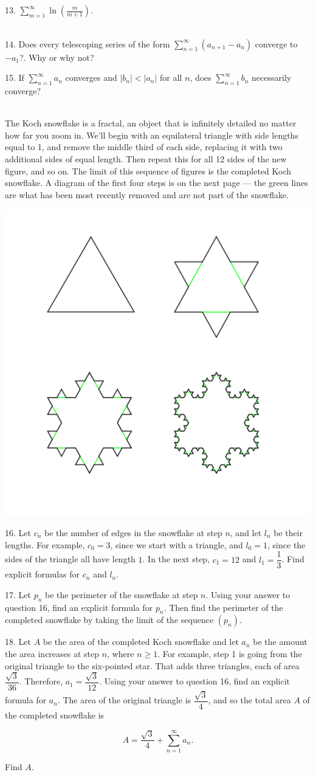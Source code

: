 \documentclass{article}
\begin{document}
13. $\displaystyle \sum_{m = 1}^\infty \ln\left( \frac{m}{m + 1} \right)$.

~\\

14. Does every telescoping series of the form $\displaystyle \sum_{n = 1}^\infty (a_{n + 1} - a_n)$ converge to $-a_1$?. Why or why not?

15. If $\displaystyle \sum_{n = 1}^\infty a_n$ converges and $|b_n| < |a_n|$ for all $n$, does $\displaystyle \sum_{n = 1}^\infty b_n$ necessarily converge?

~\\

The Koch snowflake is a fractal, an object that is infinitely detailed no matter how far you zoom in. We'll begin with an equilateral triangle with side lengths equal to 1, and remove the middle third of each side, replacing it with two additional sides of equal length. Then repeat this for all 12 sides of the new figure, and so on. The limit of this sequence of figures is the completed Koch snowflake. A diagram of the first four steps is on the next page --- the green lines are what has been most recently removed and are not part of the snowflake.

\begin{center}
	\includegraphics[width=0.5\linewidth]{koch-snowflake.png}
\end{center}

16. Let $c_n$ be the number of edges in the snowflake at step $n$, and let $l_n$ be their lengths. For example, $c_0 = 3$, since we start with a triangle, and $l_0 = 1$, since the sides of the triangle all have length $1$. In the next step, $c_1 = 12$ and $l_1 = \dfrac{1}{3}$. Find explicit formulas for $c_n$ and $l_n$.

17. Let $p_n$ be the perimeter of the snowflake at step $n$. Using your answer to question 16, find an explicit formula for $p_n$. Then find the perimeter of the completed snowflake by taking the limit of the sequence $(p_n)$.

18. Let $A$ be the area of the completed Koch snowflake and let $a_n$ be the amount the area increases at step $n$, where $n \geq 1$. For example, step 1 is going from the original triangle to the six-pointed star. That adds three triangles, each of area $\dfrac{\sqrt{3}}{36}$. Therefore, $a_1 = \dfrac{\sqrt{3}}{12}$. Using your answer to question 16, find an explicit formula for $a_n$. The area of the original triangle is $\dfrac{\sqrt{3}}{4}$, and so the total area $A$ of the completed snowflake is

$$
	A = \frac{\sqrt{3}}{4} + \sum_{n = 1}^\infty a_n.
$$

Find $A$.
\end{document}
